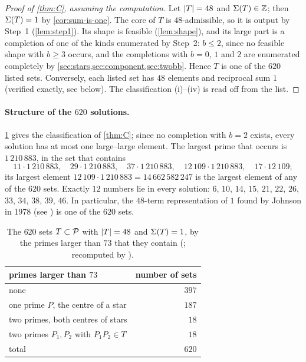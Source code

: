 \documentclass[11pt]{article}
\begin{document}
\begin{proof}[Proof of \cref{thm:C}, assuming the computation]
Let $\lvert T\rvert=48$ and $\Sigma(T)\in\mathbb{Z}$; then $\Sigma(T)=1$ by \cref{cor:sum-is-one}. The core of $T$ is $48$-admissible, so it is output by Step~1 (\cref{lem:step1}). Its shape is feasible (\cref{lem:shape}), and its large part is a completion of one of the kinds enumerated by Step~2: $b\le2$, since no feasible shape with $b\ge3$ occurs, and the completions with $b=0$, $1$ and $2$ are enumerated completely by \cref{sec:stars,sec:component,sec:twobb}. Hence $T$ is one of the $620$ listed sets. Conversely, each listed set has $48$ elements and reciprocal sum $1$ (verified exactly, see below).
The classification (i)--(iv) is read off from the list.
\end{proof}

\paragraph{Structure of the $620$ solutions.}
\cref{tab:solutions48} gives the classification of \cref{thm:C}; since no completion with $b=2$ exists, every solution has at most one large--large element.
The largest prime that occurs is $1\,210\,883$, in the set that contains
\[
11\cdot1\,210\,883,\quad 29\cdot1\,210\,883,\quad 37\cdot1\,210\,883,\quad 12\,109\cdot1\,210\,883,\quad 17\cdot12\,109 ;
\]
its largest element $12\,109\cdot1\,210\,883=14\,662\,582\,247$ is the largest element of any of the $620$ sets.
Exactly $12$ numbers lie in every solution: $6$, $10$, $14$, $15$, $21$, $22$, $26$, $33$, $34$, $38$, $39$, $46$.
In particular, the $48$-term representation of $1$ found by Johnson in 1978 (see \cite{Watanabe2020}) is one of the $620$ sets.

\begin{table}[ht]
\centering
\caption{The $620$ sets $T\subset\mathcal{P}$ with $\lvert T\rvert=48$ and $\Sigma(T)=1$, by the primes larger than $73$ that they contain (\protect{}; recomputed by \protect{}).}
\label{tab:solutions48}
\small
\begin{tabular}{@{}lr@{}}
\toprule
primes larger than $73$ & number of sets\\
\midrule
none & $397$\\
one prime $P$, the centre of a star & $187$\\
two primes, both centres of stars & $18$\\
two primes $P_1,P_2$ with $P_1P_2\in T$ & $18$\\
\midrule
total & $620$\\
\bottomrule
\end{tabular}
\end{table}
\end{document}

